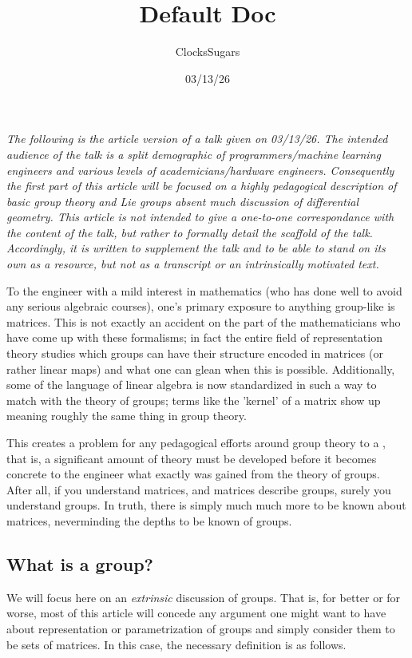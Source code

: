 \documentclass[11pt]{article}
\title{\textbf{Default Doc}}
\author{ClocksSugars}
\date{03/13/26}
\begin{document}
\emph{The following is the article version of a talk given on 03/13/26. The intended audience of the talk is a split demographic of programmers/machine learning engineers and various levels of academicians/hardware engineers. Consequently the first part of this article will be focused on a highly pedagogical description of basic group theory and Lie groups absent much discussion of differential geometry. This article is not intended to give a one-to-one correspondance with the content of the talk, but rather to formally detail the scaffold of the talk. Accordingly, it is written to supplement the talk and to be able to stand on its own as a resource, but not as a transcript or an intrinsically motivated text.}

To the engineer with a mild interest in mathematics (who has done well to avoid any serious algebraic courses), one's primary exposure to anything group-like is matrices. This is not exactly an accident on the part of the mathematicians who have come up with these formalisms; in fact the entire field of representation theory studies which groups can have their structure encoded in matrices (or rather linear maps) and what one can glean when this is possible. Additionally, some of the language of linear algebra is now standardized in such a way to match with the theory of groups; terms like the 'kernel' of a matrix show up meaning roughly the same thing in group theory.

This creates a problem for any pedagogical efforts around group theory to a , that is, a significant amount of theory must be developed before it becomes concrete to the engineer what exactly was gained from the theory of groups. After all, if you understand matrices, and matrices describe groups, surely you understand groups. In truth, there is simply much much more to be known about matrices, neverminding the depths to be known of groups.

\subsection{What is a group?}
We will focus here on an \emph{extrinsic} discussion of groups. That is, for better or for worse, most of this article will concede any argument one might want to have about representation or parametrization of groups and simply consider them to be sets of matrices. In this case, the necessary definition is as follows.
\end{document}
